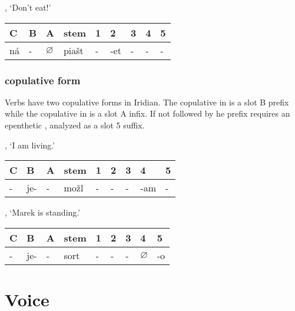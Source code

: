 \a {}, `Don't eat!'
\begin{center}
	\small
	\begin{tabu}to \textwidth{MMMM[1.5]MMMMM}
		\toprule
		C&B&A&{\sc stem}&1&2&3&4&5\\
		\midrule
		\addlinespace
		ná&-&$\varnothing$&pia\v{s}t&-&-et&-&-&-\\
		\bottomrule
	\end{tabu}
\end{center}
\xe

\subsubsection{copulative form}
\par Verbs have two copulative forms in Iridian. The copulative in  is a slot B prefix while the copulative in  is a slot A infix. If not followed by he prefix  requires an epenthetic , analyzed as a slot 5 suffix.

\ex {}, `I am living.'

\begin{center}
	\small
	\begin{tabu}to \textwidth{MMMM[1.5]MMMMM}
		\toprule
		C&B&A&{\sc stem}&1&2&3&4&5\\
		\midrule
		\addlinespace
		-&je-&-&mo\v{z}l&-&-&-&-am&-\\
		\bottomrule
	\end{tabu}
\end{center}
\xe

\ex {}, `Marek is standing.'

\begin{center}
	\small
	\begin{tabu}to \textwidth{MMMM[1.5]MMMMM}
		\toprule
		C&B&A&{\sc stem}&1&2&3&4&5\\
		\midrule
		\addlinespace
		-&je-&-&sort&-&-&-&$\varnothing$&-o\\
		\bottomrule
	\end{tabu}
\end{center}
\xe

\section{Voice}

